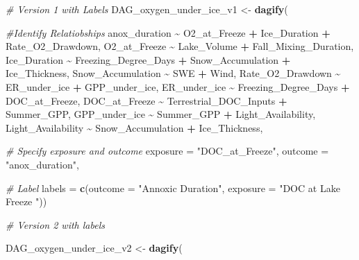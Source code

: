 \documentclass[
]{article}
\newenvironment{Shaded}{\begin{snugshade}}{\end{snugshade}}
\newcommand{\AttributeTok}[1]{\textcolor[rgb]{0.13,0.29,0.53}{#1}}
\newcommand{\CommentTok}[1]{\textcolor[rgb]{0.56,0.35,0.01}{\textit{#1}}}
\newcommand{\FunctionTok}[1]{\textcolor[rgb]{0.13,0.29,0.53}{\textbf{#1}}}
\newcommand{\NormalTok}[1]{#1}
\newcommand{\OtherTok}[1]{\textcolor[rgb]{0.56,0.35,0.01}{#1}}
\newcommand{\SpecialCharTok}[1]{\textcolor[rgb]{0.81,0.36,0.00}{\textbf{#1}}}
\newcommand{\StringTok}[1]{\textcolor[rgb]{0.31,0.60,0.02}{#1}}
\begin{document}
\begin{Shaded}
\begin{Highlighting}[]
\CommentTok{\# Version 1 with Labels }
\NormalTok{    DAG\_oxygen\_under\_ice\_v1 }\OtherTok{\textless{}{-}} \FunctionTok{dagify}\NormalTok{(}
      
      \CommentTok{\#Identify Relatiobships }
\NormalTok{      anox\_duration }\SpecialCharTok{\textasciitilde{}}\NormalTok{ O2\_at\_Freeze }\SpecialCharTok{+}\NormalTok{ Ice\_Duration }\SpecialCharTok{+}\NormalTok{ Rate\_O2\_Drawdown,}
\NormalTok{      O2\_at\_Freeze }\SpecialCharTok{\textasciitilde{}}\NormalTok{ Lake\_Volume }\SpecialCharTok{+}\NormalTok{ Fall\_Mixing\_Duration,}
\NormalTok{      Ice\_Duration }\SpecialCharTok{\textasciitilde{}}\NormalTok{ Freezing\_Degree\_Days }\SpecialCharTok{+}\NormalTok{ Snow\_Accumulation }\SpecialCharTok{+}\NormalTok{ Ice\_Thickness, }
\NormalTok{      Snow\_Accumulation }\SpecialCharTok{\textasciitilde{}}\NormalTok{ SWE }\SpecialCharTok{+}\NormalTok{ Wind,}
\NormalTok{      Rate\_O2\_Drawdown }\SpecialCharTok{\textasciitilde{}}\NormalTok{ ER\_under\_ice }\SpecialCharTok{+}\NormalTok{ GPP\_under\_ice, }
\NormalTok{      ER\_under\_ice }\SpecialCharTok{\textasciitilde{}}\NormalTok{ Freezing\_Degree\_Days }\SpecialCharTok{+}\NormalTok{ DOC\_at\_Freeze,}
\NormalTok{      DOC\_at\_Freeze }\SpecialCharTok{\textasciitilde{}}\NormalTok{ Terrestrial\_DOC\_Inputs }\SpecialCharTok{+}\NormalTok{ Summer\_GPP, }
\NormalTok{      GPP\_under\_ice }\SpecialCharTok{\textasciitilde{}}\NormalTok{ Summer\_GPP }\SpecialCharTok{+}\NormalTok{ Light\_Availability,}
\NormalTok{      Light\_Availability }\SpecialCharTok{\textasciitilde{}}\NormalTok{ Snow\_Accumulation }\SpecialCharTok{+}\NormalTok{ Ice\_Thickness,}
    
      \CommentTok{\# Specify exposure and outcome }
      \AttributeTok{exposure =} \StringTok{"DOC\_at\_Freeze"}\NormalTok{, }
      \AttributeTok{outcome =} \StringTok{"anox\_duration"}\NormalTok{,}
      
      \CommentTok{\# Label }
      \AttributeTok{labels =} \FunctionTok{c}\NormalTok{(}\AttributeTok{outcome =} \StringTok{"Annoxic Duration"}\NormalTok{,}
                 \AttributeTok{exposure =} \StringTok{"DOC at Lake Freeze "}\NormalTok{))}


\CommentTok{\# Version 2 with labels }

\NormalTok{    DAG\_oxygen\_under\_ice\_v2 }\OtherTok{\textless{}{-}} \FunctionTok{dagify}\NormalTok{(}
      

\end{Highlighting}
\end{Shaded}
\end{document}
